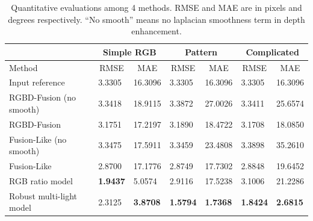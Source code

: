 \begin{table}[!ht]
\caption{Quantitative evaluations among 4 methods. RMSE and MAE are in pixels and degrees respectively. ``No smooth'' means no laplacian smoothness term in depth enhancement.}
\vspace{0.5em}
\label{tab:comp_syn_eval}
\centering
\begin{tabular}{lllllll}
                                       & \multicolumn{2}{c}{Simple RGB}                     & \multicolumn{2}{c}{Pattern}                        & \multicolumn{2}{c}{Complicated}            \\\hline
Method                                 & \multicolumn{1}{c}{RMSE} & \multicolumn{1}{c}{MAE} & \multicolumn{1}{c}{RMSE} & \multicolumn{1}{c}{MAE} & \multicolumn{1}{c}{RMSE} & \multicolumn{1}{c}{MAE} \\\hline\hline
Input reference                              & 3.3305                   & 16.3096                 & 3.3305                   & 16.3096                 & 3.3305                   & 16.3096                 \\
RGBD-Fusion\cite{or2015rgbd} (no smooth)                       & 3.3418                   & 18.9115                 & 3.3872                   & 27.0026                 & 3.3411                   & 25.6574          \\
RGBD-Fusion\cite{or2015rgbd} & 3.1751                   & 17.2197                 & 3.1890                   & 18.4722                 & 3.1708                   & 18.0850                 \\ 
Fusion-Like (no smooth)                  & 3.3475                   & 17.5911                 & 3.3459                   & 23.4808                 & 3.3898                   & 35.2610                 \\
Fusion-Like                        & 2.8700                   & 17.1776                 & 2.8749                   & 17.7302                 & 2.8848                   & 19.6452                 \\
RGB ratio model                        & \textbf{1.9437}          & 5.0574         & 2.9116                   & 17.5238                 & 3.1006                   & 21.2286                 \\
Robust multi-light model               & 2.3125                   & \textbf{3.8708}                  & \textbf{1.5794}          & \textbf{1.7368}         & \textbf{1.8424}          & \textbf{2.6815}  \\\hline      
\end{tabular}
\end{table}



